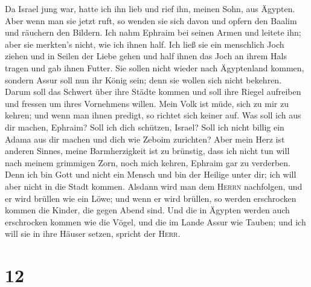  Da Israel jung war, hatte ich ihn lieb und rief ihn,
meinen Sohn, aus Ägypten.  Aber wenn man sie jetzt ruft,
so wenden sie sich davon und opfern den Baalim und räuchern den Bildern.
 Ich nahm Ephraim bei seinen Armen und leitete ihn; aber
sie merkten's nicht, wie ich ihnen half.  Ich ließ sie ein
menschlich Joch ziehen und in Seilen der Liebe gehen und half ihnen das
Joch an ihrem Hals tragen und gab ihnen Futter.  Sie
sollen nicht wieder nach Ägyptenland kommen, sondern Assur soll nun ihr
König sein; denn sie wollen sich nicht bekehren.  Darum
soll das Schwert über ihre Städte kommen und soll ihre Riegel aufreiben
und fressen um ihres Vornehmens willen.  Mein Volk ist
müde, sich zu mir zu kehren; und wenn man ihnen predigt, so richtet sich
keiner auf.  Was soll ich aus dir machen, Ephraim? Soll
ich dich schützen, Israel? Soll ich nicht billig ein Adama aus dir
machen und dich wie Zeboim zurichten? Aber mein Herz ist anderen Sinnes,
meine Barmherzigkeit ist zu brünstig,  dass ich nicht tun
will nach meinem grimmigen Zorn, noch mich kehren, Ephraim gar zu
verderben. Denn ich bin Gott und nicht ein Mensch und bin der Heilige
unter dir; ich will aber nicht in die Stadt kommen. 
Alsdann wird man dem \textsc{Herrn} nachfolgen, und er wird brüllen wie
ein Löwe; und wenn er wird brüllen, so werden erschrocken kommen die
Kinder, die gegen Abend sind.  Und die in Ägypten werden
auch erschrocken kommen wie die Vögel, und die im Lande Assur wie
Tauben; und ich will sie in ihre Häuser setzen, spricht der
\textsc{Herr}.

\hypertarget{section-11}{%
\section{12}\label{section-11}}


